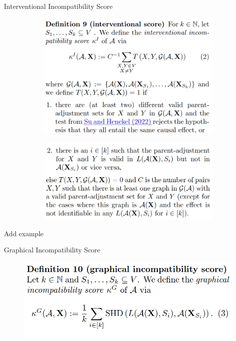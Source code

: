 \documentclass{beamer}
\begin{document}
\begin{frame}{Interventional Incompatibility Score}
	\begin{figure}
		\begin{subfigure}{\textwidth}
			\centering
			\includegraphics[scale=0.23]{imgs/def_9_1.png}
		\end{subfigure}
		\begin{subfigure}{\textwidth}
			\centering
			\includegraphics[scale=0.23]{imgs/def_9_2.png}
		\end{subfigure}
	\end{figure}
\end{frame}

\begin{frame}
	Add example
\end{frame}


\begin{frame}{Graphical Incompatibility Score}
	\begin{figure}
		\centering
		\includegraphics[scale=0.25]{imgs/def_10.png}
	\end{figure}
\end{frame}
\end{document}
